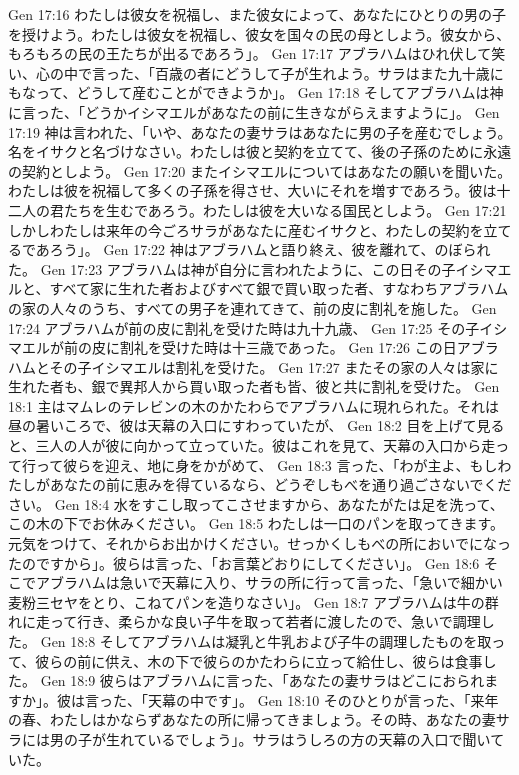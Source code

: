 Gen 17:16  わたしは彼女を祝福し、また彼女によって、あなたにひとりの男の子を授けよう。わたしは彼女を祝福し、彼女を国々の民の母としよう。彼女から、もろもろの民の王たちが出るであろう」。
Gen 17:17  アブラハムはひれ伏して笑い、心の中で言った、「百歳の者にどうして子が生れよう。サラはまた九十歳にもなって、どうして産むことができようか」。
Gen 17:18  そしてアブラハムは神に言った、「どうかイシマエルがあなたの前に生きながらえますように」。
Gen 17:19  神は言われた、「いや、あなたの妻サラはあなたに男の子を産むでしょう。名をイサクと名づけなさい。わたしは彼と契約を立てて、後の子孫のために永遠の契約としよう。
Gen 17:20  またイシマエルについてはあなたの願いを聞いた。わたしは彼を祝福して多くの子孫を得させ、大いにそれを増すであろう。彼は十二人の君たちを生むであろう。わたしは彼を大いなる国民としよう。
Gen 17:21  しかしわたしは来年の今ごろサラがあなたに産むイサクと、わたしの契約を立てるであろう」。
Gen 17:22  神はアブラハムと語り終え、彼を離れて、のぼられた。
Gen 17:23  アブラハムは神が自分に言われたように、この日その子イシマエルと、すべて家に生れた者およびすべて銀で買い取った者、すなわちアブラハムの家の人々のうち、すべての男子を連れてきて、前の皮に割礼を施した。
Gen 17:24  アブラハムが前の皮に割礼を受けた時は九十九歳、
Gen 17:25  その子イシマエルが前の皮に割礼を受けた時は十三歳であった。
Gen 17:26  この日アブラハムとその子イシマエルは割礼を受けた。
Gen 17:27  またその家の人々は家に生れた者も、銀で異邦人から買い取った者も皆、彼と共に割礼を受けた。
Gen 18:1  主はマムレのテレビンの木のかたわらでアブラハムに現れられた。それは昼の暑いころで、彼は天幕の入口にすわっていたが、
Gen 18:2  目を上げて見ると、三人の人が彼に向かって立っていた。彼はこれを見て、天幕の入口から走って行って彼らを迎え、地に身をかがめて、
Gen 18:3  言った、「わが主よ、もしわたしがあなたの前に恵みを得ているなら、どうぞしもべを通り過ごさないでください。
Gen 18:4  水をすこし取ってこさせますから、あなたがたは足を洗って、この木の下でお休みください。
Gen 18:5  わたしは一口のパンを取ってきます。元気をつけて、それからお出かけください。せっかくしもべの所においでになったのですから」。彼らは言った、「お言葉どおりにしてください」。
Gen 18:6  そこでアブラハムは急いで天幕に入り、サラの所に行って言った、「急いで細かい麦粉三セヤをとり、こねてパンを造りなさい」。
Gen 18:7  アブラハムは牛の群れに走って行き、柔らかな良い子牛を取って若者に渡したので、急いで調理した。
Gen 18:8  そしてアブラハムは凝乳と牛乳および子牛の調理したものを取って、彼らの前に供え、木の下で彼らのかたわらに立って給仕し、彼らは食事した。
Gen 18:9  彼らはアブラハムに言った、「あなたの妻サラはどこにおられますか」。彼は言った、「天幕の中です」。
Gen 18:10  そのひとりが言った、「来年の春、わたしはかならずあなたの所に帰ってきましょう。その時、あなたの妻サラには男の子が生れているでしょう」。サラはうしろの方の天幕の入口で聞いていた。
